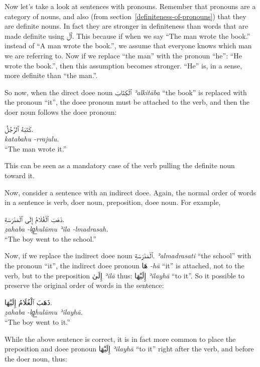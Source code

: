 \documentclass[
  10pt,
]{book}
\begin{document}
Now let's take a look at sentences with pronouns. Remember that pronouns are a category of nouns, and also (from section~\ref{definiteness-of-pronouns}) that they are definite nouns. In fact they are stronger in definiteness than words that are made definite using \foreignlanguage{arabic}{ٱَلْ}. This because if when we say \enquote{The man wrote the book.} instead of \enquote{A man wrote the book.}, we assume that everyone knows which man we are referring to. Now if we replace \enquote{the man} with the pronoun \enquote{he}: \enquote{He wrote the book.}, then this assumption becomes stronger. \enquote{He} is, in a sense, more definite than \enquote{the man.}.

So now, when the direct doee noun \foreignlanguage{arabic}{ٱلْکِتَابَ} \emph{ʾalkitāba} \enquote{the book} is replaced with the pronoun \enquote{it}, the doee pronoun must be attached to the verb, and then the doer noun follows the doee pronoun:

\foreignlanguage{arabic}{کَتَبَهُ ٱلرَّجُلُ.}\\
\emph{katabahu -rrajulu.}\\
\enquote{The man wrote it.}

This can be seen as a mandatory case of the verb pulling the definite noun toward it.

Now, consider a sentence with an indirect doee. Again, the normal order of words in a sentence is verb, doer noun, preposition, doee noun. For example,

\foreignlanguage{arabic}{ذَهَبَ ٱلْغُلَامُ إِلَى ٱلْمَدْرَسَةِ.}\\
\emph{ẕahaba -lg͟hulāmu ʾila -lmadrasah.}\\
\enquote{The boy went to the school.}

Now, if we replace the indirect doee noun \foreignlanguage{arabic}{ٱلْمَدْرَسَةِ.} \emph{ʾalmadrasati} \enquote{the school} with the pronoun \enquote{it}, the indirect doee pronoun \foreignlanguage{arabic}{هَا} \emph{-hā} \enquote{it} is attached, not to the verb, but to the preposition \foreignlanguage{arabic}{إِلَىٰ} \emph{ʾilā} thus: \foreignlanguage{arabic}{إِلَيْهَا} \emph{ʾilayhā} \enquote{to it}. So it possible to preserve the original order of words in the sentence:

\foreignlanguage{arabic}{ذَهَبَ ٱلْغُلَامُ إِلَيْهَا.}\\
\emph{ẕahaba -lg͟hulāmu ʾilayhā.}\\
\enquote{The boy went to it.}

While the above sentence is correct, it is in fact more common to place the preposition and doee pronoun \foreignlanguage{arabic}{إِلَيْهَا} \emph{ʾilayhā} \enquote{to it} right after the verb, and before the doer noun, thus:
\end{document}
